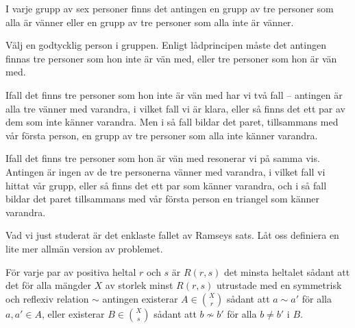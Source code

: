 \documentclass[nobib]{tufte-handout}
\begin{document}
\begin{example}\label{example_R33_is_6}
  I varje grupp av sex personer finns det antingen en grupp av tre personer som alla är vänner eller en grupp av tre personer som alla inte är vänner.

  Välj en godtycklig person i gruppen. Enligt lådprincipen måste det antingen finnas tre personer som hon inte är vän med, eller tre personer som hon är vän med.

  Ifall det finns tre personer som hon inte är vän med har vi två fall -- antingen är alla tre vänner med varandra, i vilket fall vi är klara, eller så finns det ett par av dem som inte känner varandra. Men i så fall bildar det paret, tillsammans med vår första person, en grupp av tre personer som alla inte känner varandra.

  Ifall det finns tre personer som hon är vän med resonerar vi på samma vis. Antingen är ingen av de tre personerna vänner med varandra, i vilket fall vi hittat vår grupp, eller så finns det ett par som känner varandra, och i så fall bildar det paret tillsammans med vår första person en triangel som känner varandra.
\end{example}

Vad vi just studerat är det enklaste fallet av Ramseys sats. Låt oss definiera en lite mer allmän version av problemet.

\begin{definition}
  För varje par av positiva heltal $r$ och $s$ är $R(r,s)$ det minsta heltalet sådant att det för alla mängder $X$ av storlek minst $R(r,s)$ utrustade med en symmetrisk och reflexiv relation $\sim$ antingen existerar $A \in \binom{X}{r}$ sådant att $a \sim a'$ för alla $a, a' \in A$, eller existerar $B \in \binom{X}{s}$ sådant att $b \not\sim b'$ för alla $b\neq b'$ i $B$.
\end{definition}
\end{document}

